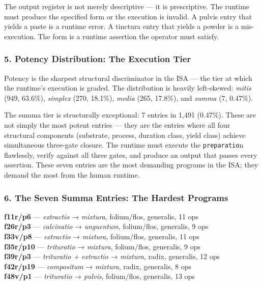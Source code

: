 The output register is not merely descriptive --- it is prescriptive.
The runtime must produce the specified form or the execution is invalid.
A pulvis entry that yields a paste is a runtime error. A tinctura entry
that yields a powder is a mis-execution. The form is a runtime assertion
the operator must satisfy.

\hypertarget{potency-distribution-the-execution-tier}{%
\subsubsection{5. Potency Distribution: The Execution
Tier}\label{potency-distribution-the-execution-tier}}

Potency is the sharpest structural discriminator in the ISA --- the tier
at which the runtime's execution is graded. The distribution is heavily
left-skewed: \emph{mitis} (949, 63.6\%), \emph{simplex} (270, 18.1\%),
\emph{media} (265, 17.8\%), and \emph{summa} (7, 0.47\%).

The summa tier is structurally exceptional: 7 entries in 1,491 (0.47\%).
These are not simply the most potent entries --- they are the entries
where all four structural components (substrate, process, duration
class, yield class) achieve simultaneous three-gate closure. The runtime
must execute the \texttt{preparatio}n flawlessly, verify against all
three gates, and produce an output that passes every assertion. These
seven entries are the most demanding programs in the ISA; they demand
the most from the human runtime.

\hypertarget{the-seven-summa-entries-the-hardest-programs}{%
\subsubsection{6. The Seven Summa Entries: The Hardest
Programs}\label{the-seven-summa-entries-the-hardest-programs}}

\textbf{f11r/p6} --- \emph{extractio} → \emph{mixtura}, folium/flos,
generalis, 11 ops\\
\textbf{f26r/p3} --- \emph{calcinatio} → \emph{unguentum}, folium/flos,
generalis, 9 ops\\
\textbf{f33v/p8} --- \emph{extractio} → \emph{mixtura}, folium/flos,
generalis, 11 ops\\
\textbf{f35r/p10} --- \emph{trituratio} → \emph{mixtura}, folium/flos,
generalis, 9 ops\\
\textbf{f39r/p3} --- \emph{trituratio + extractio} → \emph{mixtura},
radix, generalis, 12 ops\\
\textbf{f42r/p19} --- \emph{compositum} → \emph{mixtura}, radix,
generalis, 8 ops\\
\textbf{f48v/p1} --- \emph{trituratio} → \emph{pulvis}, folium/flos,
generalis, 13 ops

